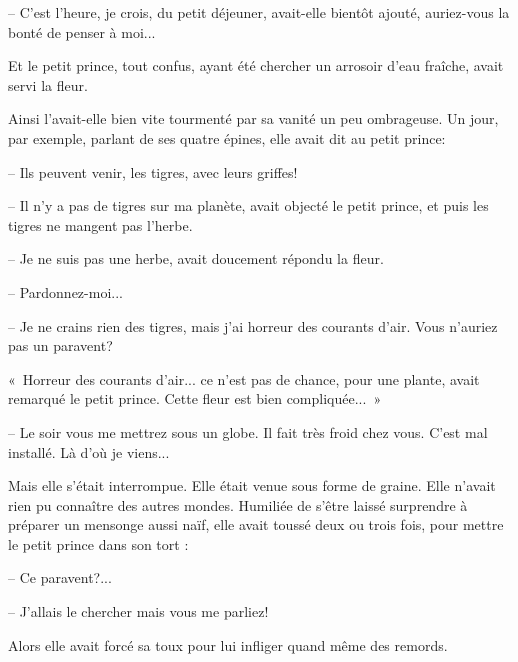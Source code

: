 \documentclass[a4paper]{report}
\begin{document}
-- C'est l'heure, je crois, du petit déjeuner, avait-elle bientôt ajouté, auriez-vous la bonté de penser à moi...


Et le petit prince, tout confus, ayant été chercher un arrosoir d'eau fraîche, avait servi la fleur.

Ainsi l'avait-elle bien vite tourmenté par sa vanité un peu ombrageuse. Un jour, par exemple, parlant de ses quatre épines, elle avait dit au petit prince:

-- Ils peuvent venir, les tigres, avec leurs griffes!

-- Il n'y a pas de tigres sur ma planète, avait objecté le petit prince, et puis les tigres ne mangent pas l'herbe. 


-- Je ne suis pas une herbe, avait doucement répondu la fleur.

-- Pardonnez-moi...

-- Je ne crains rien des tigres, mais j'ai horreur des courants d'air. Vous n'auriez pas un paravent?

«~Horreur des courants d'air... ce n'est pas de chance, pour une plante, avait remarqué le petit prince. Cette fleur est bien compliquée...~»

-- Le soir vous me mettrez sous un globe. Il fait très froid chez vous. C'est mal installé. Là d'où je viens...

Mais elle s'était interrompue. Elle était venue sous forme de graine. Elle n'avait rien pu connaître des autres mondes. Humiliée de s'être laissé surprendre à préparer un mensonge aussi naïf, elle avait toussé deux ou trois fois, pour mettre le petit prince dans son tort :


-- Ce paravent?...

-- J'allais le chercher mais vous me parliez!

Alors elle avait forcé sa toux pour lui infliger quand même des remords.
\end{document}
